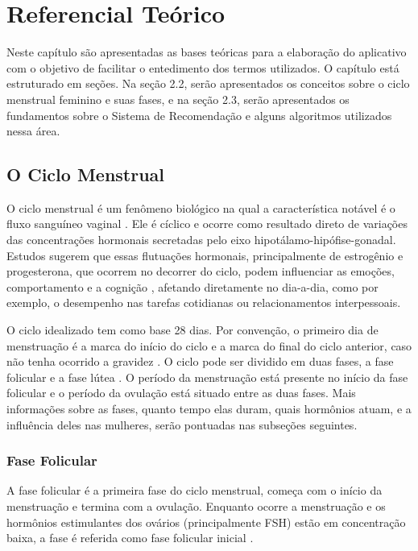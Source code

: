 \chapter[Referencial Teórico]{Referencial Teórico}
\label{ch:referencial}

Neste capítulo são apresentadas as bases teóricas para a elaboração do 
aplicativo com o objetivo de facilitar o entedimento dos termos utilizados. 
O capítulo está estruturado em seções. Na seção 2.2, serão apresentados os 
conceitos sobre o ciclo menstrual feminino e suas fases, e na seção 2.3, serão 
apresentados os fundamentos sobre o Sistema de Recomendação e alguns algoritmos 
utilizados nessa área.

\section{O Ciclo Menstrual}

O ciclo menstrual é um fenômeno biológico 
na qual a característica notável é o fluxo sanguíneo vaginal \cite{guyton2012}.
Ele é cíclico e ocorre como resultado direto de variações das concentrações
hormonais secretadas pelo eixo hipotálamo-hipófise-gonadal. Estudos sugerem
que essas flutuações hormonais, principalmente de estrogênio e progesterona,
que ocorrem no decorrer do ciclo, podem influenciar as emoções,
comportamento e a cognição \cite{poroma2014}, afetando
diretamente no dia-a-dia, como por exemplo, o desempenho nas tarefas
cotidianas ou relacionamentos interpessoais.


O ciclo idealizado tem como base 28 dias. Por convenção, o primeiro dia de
menstruação é a marca do início do ciclo e a marca do final do ciclo
anterior, caso não tenha ocorrido a gravidez \cite{lenton1984a}. O ciclo
pode ser dividido em duas fases, a fase folicular e a fase lútea
\cite{brondin2008}. O período da menstruação está presente no início da
fase folicular e o período da ovulação está situado entre as duas fases.
Mais informações sobre as fases, quanto tempo elas duram, quais hormônios
atuam, e a influência deles nas mulheres, serão pontuadas nas subseções
seguintes.


\subsection{Fase Folicular}

A fase folicular é a primeira fase do ciclo menstrual, começa com o início
da menstruação e termina com a ovulação. Enquanto ocorre a menstruação e os
hormônios estimulantes dos ovários (principalmente FSH) estão em concentração
baixa, a fase é referida como fase folicular inicial \cite{lenton1984a}.


